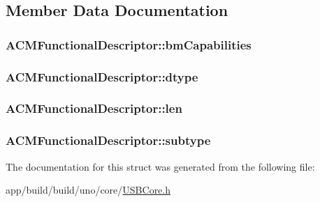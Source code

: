 \subsection{Member Data Documentation}
\hypertarget{struct_a_c_m_functional_descriptor_a218920f326b1c8f3faacd4a9592f30d8}{
\subsubsection[{bm\-Capabilities}]{ A\-C\-M\-Functional\-Descriptor\-::bm\-Capabilities}}\label{struct_a_c_m_functional_descriptor_a218920f326b1c8f3faacd4a9592f30d8}
\hypertarget{struct_a_c_m_functional_descriptor_aefd5ee02fa9ef19cc96ee191e90a1c90}{
\subsubsection[{dtype}]{ A\-C\-M\-Functional\-Descriptor\-::dtype}}\label{struct_a_c_m_functional_descriptor_aefd5ee02fa9ef19cc96ee191e90a1c90}
\hypertarget{struct_a_c_m_functional_descriptor_aaeda91f387fb2185f703edcbec992398}{
\subsubsection[{len}]{ A\-C\-M\-Functional\-Descriptor\-::len}}\label{struct_a_c_m_functional_descriptor_aaeda91f387fb2185f703edcbec992398}
\hypertarget{struct_a_c_m_functional_descriptor_a9b7727390ce66baee8b7175dbab62a81}{
\subsubsection[{subtype}]{ A\-C\-M\-Functional\-Descriptor\-::subtype}}\label{struct_a_c_m_functional_descriptor_a9b7727390ce66baee8b7175dbab62a81}


The documentation for this struct was generated from the following file\-:\begin{DoxyCompactItemize}
\item 
app/build/build/uno/core/\hyperlink{_u_s_b_core_8h}{U\-S\-B\-Core.\-h}\end{DoxyCompactItemize}
